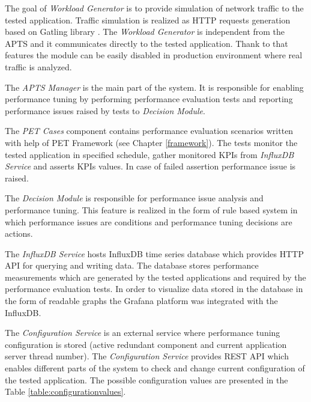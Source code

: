 \documentclass[12pt,a4paper]{article}
\begin{document}
The goal of \textit{Workload Generator} is to provide simulation of network traffic to the tested application. Traffic simulation is realized as HTTP requests generation based on Gatling library \cite{gatling}. The \textit{Workload Generator} is independent from the APTS and it communicates directly to the tested application. Thank to that features the module can be easily disabled in production environment where real traffic is analyzed.  

The \textit{APTS Manager} is the main part of the system. It is responsible for enabling performance tuning by performing performance evaluation tests and reporting performance issues raised by tests to \textit{Decision Module}. 

The \textit{PET Cases} component contains performance evaluation scenarios written with help of PET Framework (see Chapter \ref{framework}). The tests monitor the tested application in specified schedule, gather monitored KPIs from \textit{InfluxDB Service} and asserts KPIs values. In case of failed assertion performance issue is raised.

The \textit{Decision Module} is responsible for performance issue analysis and performance tuning. This feature is realized in the form of rule based system in which performance issues are conditions and performance tuning decisions are actions.   

The \textit{InfluxDB Service} hosts InfluxDB \cite{influxdb} time series database which provides HTTP API for querying and writing data. The database stores performance measurements which are generated by the tested applications and required by the performance evaluation tests. In order to visualize data stored in the database in the form of readable graphs the Grafana \cite{grafana} platform was integrated with the InfluxDB. 

The \textit{Configuration Service} is an external service where performance tuning configuration is stored (active redundant component and current application server thread number). The \textit{Configuration Service} provides REST API which enables different parts of the system to check and change current configuration of the tested application. The possible configuration values are presented in the Table \ref{table:configurationvalues}.
\end{document}
